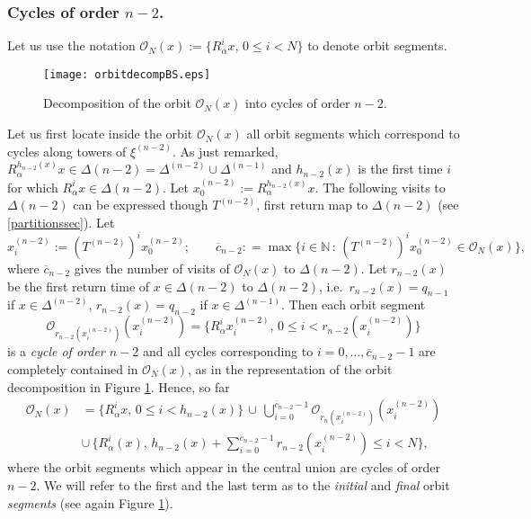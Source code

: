 \documentclass{conm-p-l}
\numberwithin{equation}{section}
\begin{document}
\subsubsection{Cycles of order $n-2$.}
Let us use the notation ${\mathcal{O}_{{N}}({x})} := \{R_{\alpha}^i x, \, 0\leq i < N \}$ to denote orbit segments.
\begin{figure}
\centering
\texttt{[image: orbitdecompBS.eps]}
\caption{Decomposition of the orbit ${\mathcal{O}_{{N}}({x})}$ into cycles of order $n-2$.\label{orbitdecompBS}}
\end{figure}
Let us first locate inside  the orbit ${\mathcal{O}_{{N}}({x})}$ all orbit segments which correspond to cycles along towers of $\xi^{(n-2)}$. As just remarked, $R_{\alpha}^{h_{n-2}(x)} x \in \Delta (n-2)= \Delta^{(n-2)}\cup \Delta^{(n-1)} $ and $h_{n-2}(x)$ is the first time $i$ for which $R_{\alpha}^i x \in \Delta(n-2)$. Let $x^{(n-2)}_0 := R_{\alpha}^{h_{n-2}(x)}x$. The following visits to $\Delta(n\!-\!2)$ can be expressed though $T^{(n-2)}$, first return map to  $\Delta(n\!-\!2)$ (see \ref{partitionssec}). Let 
\begin{equation*}
x^{(n-2)}_i :=\left(T^{(n-2)}\right)^i  x^{(n-2)}_0; \qquad
\overline{c}_{n-2} : = \max \{ i \in \mathbb{N} {\, : \, } \left(T^{(n-2)}\right)^i  x^{(n-2)}_0 \in {\mathcal{O}_{{N}}({x})}\},
\end{equation*}
where $\overline{c}_{n-2}$ gives the number of visits of  ${\mathcal{O}_{{N}}({x})}$ to  $\Delta(n\!-\!2)$.
Let $r_{n-2}(x)$ be the first return time of $x\in \Delta{(n-2)} $ to  $\Delta{(n-2)}$, i.e.~$r_{n-2}(x)= q_{n-1}$ if $x\in  \Delta^{(n-2)}$,  $r_{n-2}(x)= q_{n-2}$ if $x\in  \Delta^{(n-1)}$. Then each orbit segment
\begin{equation*}
{\mathcal{O}_{{r_{n-2}(x^{(n-2)}_i)}}({x^{(n-2)}_i})} =  \{R_{\alpha}^i x^{(n-2)}_i, \, 0\leq i < {{r}}_{n-2}(x^{(n-2)}_i ) \}
\end{equation*}
is a \emph{cycle of order $n-2$} and all cycles corresponding to $i=0,\dots, \overline{c}_{n-2} -1 $ are completely contained in ${\mathcal{O}_{{N}}({x})}$, as in the representation of the orbit decomposition in Figure \ref{orbitdecompBS}.
Hence, so far
\begin{equation}\label{orbitdecompn-2}
\begin{split}
{\mathcal{O}_{{N}}({x})} & =  
\{R_{\alpha}^i x, \, 0\leq i < h_{n-2}(x) \} \,
\cup \,
\bigcup_{i=0}^{\overline{c}_{n-2}-1} {\mathcal{O}_{{{r}_n(x^{(n-2)}_i)}}({x^{(n-2)}_i})} \\ & \cup  \,
\{R_{\alpha}^i (x ), \,h_{n-2}(x)+ \sum_{i=0}^{\overline{c}_{n-2}-1} {r}_{n-2}(x^{(n-2)}_i) \leq i < N \},
\end{split}
\end{equation}
where the orbit segments which appear in the central union are cycles of order $n-2$. We will refer to the first and the last term as to the \emph{initial} and \emph{final} orbit \emph{segments} (see again Figure \ref{orbitdecompBS}).
\end{document}

